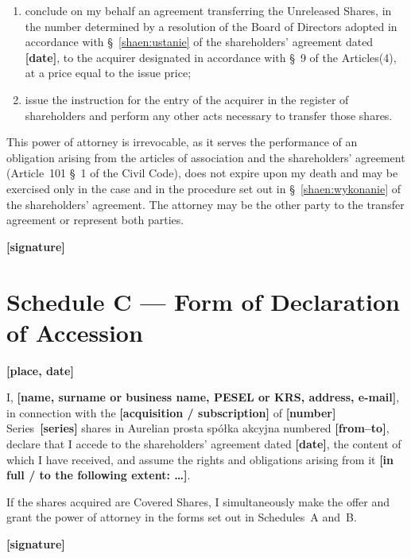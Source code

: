 \documentclass[12pt,a4paper]{report}
\newcommand{\field}[1]{\textbf{[#1]}}
\newcommand{\CompanyFull}{Aurelian prosta spółka akcyjna}
\newcommand{\USen}[1]{\S~#1 of the Articles}
\begin{document}
\begin{enumerate}
  \item conclude on my behalf an agreement transferring the Unreleased Shares, in the number determined by a resolution of the Board of Directors adopted in accordance with \S~\ref{shaen:ustanie} of the shareholders' agreement dated \field{date}, to the acquirer designated in accordance with \USen{9}(4), at a price equal to the issue price;
  \item issue the instruction for the entry of the acquirer in the register of shareholders and perform any other acts necessary to transfer those shares.
\end{enumerate}

This power of attorney is irrevocable, as it serves the performance of an obligation arising from the articles of association and the shareholders' agreement (Article~101 \S~1 of the Civil Code), does not expire upon my death and may be exercised only in the case and in the procedure set out in \S~\ref{shaen:wykonanie} of the shareholders' agreement. The attorney may be the other party to the transfer agreement or represent both parties.

\field{signature}

\newpage
\section*{Schedule C --- Form of Declaration of Accession}

\field{place, date}

I, \field{name, surname or business name, PESEL or KRS, address, e-mail}, in connection with the \field{acquisition / subscription} of \field{number} Series~\field{series} shares in \CompanyFull{} numbered \field{from--to}, declare that I accede to the shareholders' agreement dated \field{date}, the content of which I have received, and assume the rights and obligations arising from it \field{in full / to the following extent: \ldots}.

If the shares acquired are Covered Shares, I simultaneously make the offer and grant the power of attorney in the forms set out in Schedules~A and~B.

\field{signature}

\end{document}
